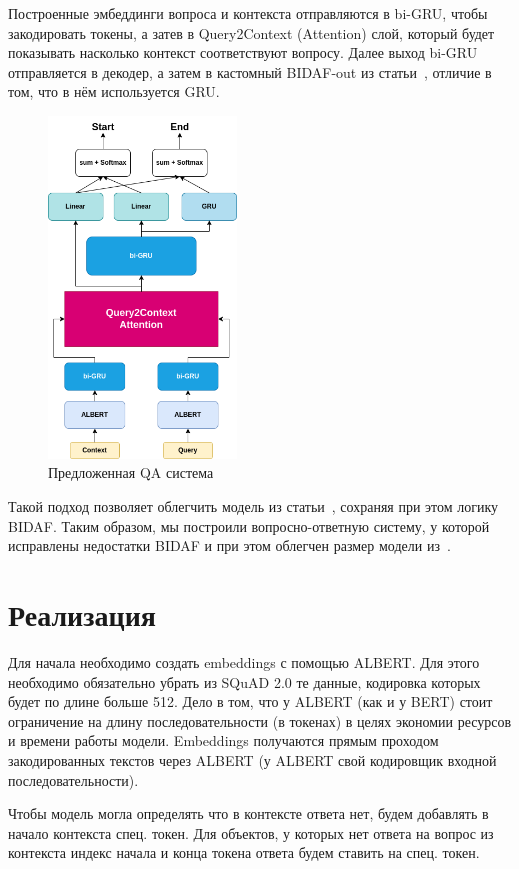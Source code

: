 \documentclass{article}
\begin{document}
Построенные эмбеддинги вопроса и контекста отправляются в bi-GRU, чтобы закодировать токены, а затев в Query2Context (Attention) слой, который будет показывать насколько контекст соответствуют вопросу. Далее выход bi-GRU отправляется в декодер, а затем в кастомный BIDAF-out из статьи~\cite{ALBERTsquad}, отличие в том, что в нём используется GRU.

\begin{figure}[!ht]
    \centering
    \includegraphics[width=50mm]{../figures/model_diagram.drawio.png}
    \caption{Предложенная QA система}
    \label{fig:customqa}
\end{figure}

Такой подход позволяет облегчить модель из статьи~\cite{ALBERTsquad}, сохраняя при этом логику BIDAF. Таким образом, мы построили вопросно-ответную систему, у которой исправлены недостатки BIDAF и при этом облегчен размер модели из~\cite{ALBERTsquad}.

\section{Реализация}

Для начала необходимо создать embeddings с помощью ALBERT. Для этого необходимо обязательно убрать из SQuAD 2.0 те данные, кодировка которых будет по длине больше 512. Дело в том, что у ALBERT (как и у BERT) стоит ограничение на длину последовательности (в токенах) в целях экономии ресурсов и времени работы модели. Embeddings получаются прямым проходом закодированных текстов через ALBERT (у ALBERT свой кодировщик входной последовательности).

Чтобы модель могла определять что в контексте ответа нет, будем добавлять в начало контекста спец. токен. Для объектов, у которых нет ответа на вопрос из контекста индекс начала и конца токена ответа будем ставить на спец. токен.
\end{document}
